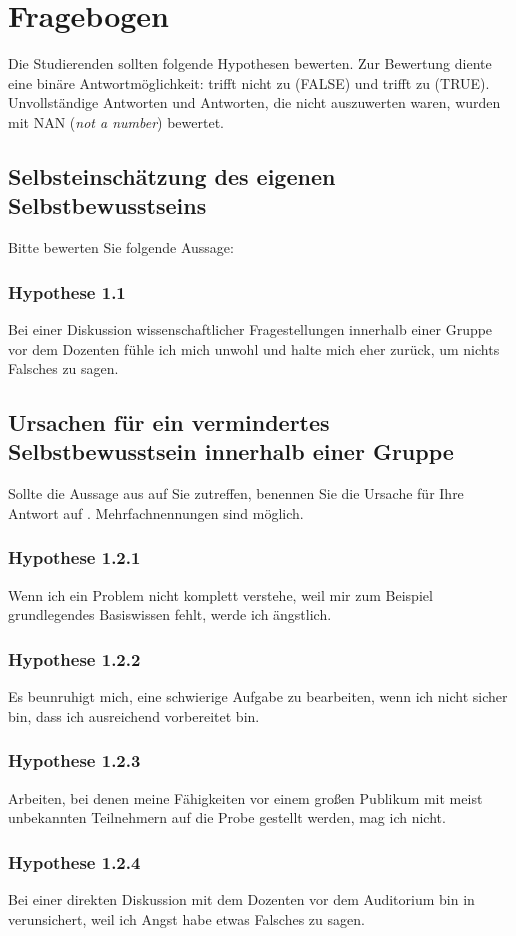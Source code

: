 \section*{Fragebogen}\label{chap:questionnaire}
Die Studierenden sollten folgende Hypothesen bewerten. Zur Bewertung diente eine binäre Antwortmöglichkeit: trifft nicht zu (FALSE) und trifft zu (TRUE). Unvollständige Antworten und Antworten, die nicht auszuwerten waren, wurden mit NAN ({\it not a number}) bewertet.

\subsection*{Selbsteinschätzung des eigenen Selbstbewusstseins}
Bitte bewerten Sie folgende Aussage:
\subsubsection*{Hypothese 1.1}
\label{chap:H_1-1}
Bei einer Diskussion wissenschaftlicher Fragestellungen innerhalb einer Gruppe vor dem Dozenten fühle ich mich unwohl und halte mich eher zurück, um nichts Falsches zu sagen.

\subsection*{Ursachen für ein vermindertes Selbstbewusstsein innerhalb einer Gruppe}
Sollte die Aussage aus  auf Sie zutreffen, benennen Sie die Ursache für Ihre Antwort auf . Mehrfachnennungen sind möglich.
\subsubsection*{Hypothese 1.2.1}
Wenn ich ein Problem nicht komplett verstehe, weil mir zum Beispiel grundlegendes Basiswissen fehlt, werde ich ängstlich.
\subsubsection*{Hypothese 1.2.2}
Es beunruhigt mich, eine schwierige Aufgabe zu bearbeiten, wenn ich nicht sicher bin, dass ich ausreichend vorbereitet bin.
\subsubsection*{Hypothese 1.2.3}
Arbeiten, bei denen meine Fähigkeiten vor einem großen Publikum mit meist unbekannten Teilnehmern auf die Probe gestellt werden, mag ich nicht.
\subsubsection*{Hypothese 1.2.4}
Bei einer direkten Diskussion mit dem Dozenten vor dem Auditorium bin in verunsichert, weil ich Angst habe etwas Falsches zu sagen.


